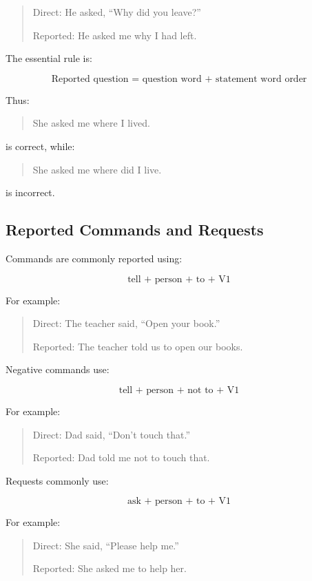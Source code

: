 \begin{quotation}
Direct: He asked, ``Why did you leave?''

Reported: He asked me why I had left.
\end{quotation}

The essential rule is:

\[
\boxed{\text{Reported question = question word + statement word order}}
\]

Thus:

\begin{quotation}
She asked me where I lived.
\end{quotation}

is correct, while:

\begin{quotation}
She asked me where did I live.
\end{quotation}

is incorrect.


\subsection{Reported Commands and Requests}

Commands are commonly reported using:

\[
\text{tell + person + to + V1}
\]

For example:

\begin{quotation}
Direct: The teacher said, ``Open your book.''

Reported: The teacher told us to open our books.
\end{quotation}

Negative commands use:

\[
\text{tell + person + not to + V1}
\]

For example:

\begin{quotation}
Direct: Dad said, ``Don't touch that.''

Reported: Dad told me not to touch that.
\end{quotation}

Requests commonly use:

\[
\text{ask + person + to + V1}
\]

For example:

\begin{quotation}
Direct: She said, ``Please help me.''

Reported: She asked me to help her.
\end{quotation}

